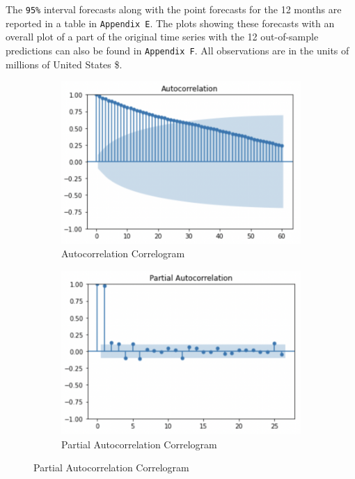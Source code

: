 \documentclass[12pt]{article}
\begin{document}
The \texttt{95\%} interval forecasts along with the point forecasts for the 12 months are reported in a table in \texttt{Appendix E}. The plots showing these forecasts  with an overall plot of a part of the original time series with the 12 out-of-sample predictions can also be found in \texttt{Appendix F}. All observations are in the units of millions of United States \$.


\begin{center}
        \printbibliography
\end{center}

\pagebreak

\begin{center}
        \textbf{\Large{}}
\end{center}

\begin{figure}[H]
	\centering
	\begin{subfigure}{1.0\textwidth}
		\includegraphics[width=\textwidth]{images/acf.png}
		\caption{Autocorrelation Correlogram}
	\end{subfigure}

	\begin{subfigure}{1.0\textwidth}
		\includegraphics[width=\textwidth]{images/pacf.png}
		\caption{Partial Autocorrelation Correlogram}
	\end{subfigure}
\end{figure}
\end{document}
